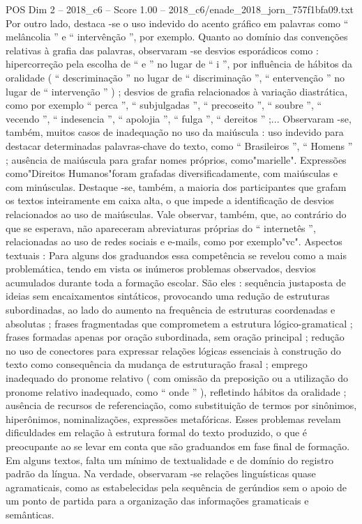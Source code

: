 \begin{textsample}{POS Dim 2 – 2018\_c6 – Score 1.00 – 2018\_c6/enade\_2018\_jorn\_757f1bfa09.txt}
Por outro lado, destaca -se o uso indevido do acento gráfico em palavras como “ melâncolia ” e “ intervênção ”, por exemplo.
Quanto ao domínio das convenções relativas à grafia das palavras, observaram -se desvios esporádicos como : hipercorreção pela escolha de “ e ” no lugar de “ i ”, por influência de hábitos da oralidade ( “ descriminação ” no lugar de “ discriminação ”, “ entervenção ” no lugar de “ intervenção ” ) ; desvios de grafia relacionados à variação diastrática, como por exemplo “ perca ”, “ subjulgadas ”, “ precoseito ”, “ soubre ”, “ vecendo ”, “ indesencia ”, “ apolojia ”, “ fulga ”, “ dereitos ” ;...
Observaram -se, também, muitos casos de inadequação no uso da maiúscula : uso indevido para destacar determinadas palavras-chave do texto, como “ Brasileiros ”, “ Homens ” ; ausência de maiúscula para grafar nomes próprios, como"marielle".
Expressões como"Direitos Humanos"foram grafadas diversificadamente, com maiúsculas e com minúsculas.
Destaque -se, também, a maioria dos participantes que grafam os textos inteiramente em caixa alta, o que impede a identificação de desvios relacionados ao uso de maiúsculas.
Vale observar, também, que, ao contrário do que se esperava, não apareceram abreviaturas próprias do “ internetês ”, relacionadas ao uso de redes sociais e e-mails, como por exemplo"vc".
Aspectos textuais : Para alguns dos graduandos essa competência se revelou como a mais problemática, tendo em vista os inúmeros problemas observados, desvios acumulados durante toda a formação escolar.
São eles : sequência justaposta de ideias sem encaixamentos sintáticos, provocando uma redução de estruturas subordinadas, ao lado do aumento na frequência de estruturas coordenadas e absolutas ; frases fragmentadas que comprometem a estrutura lógico-gramatical ; frases formadas apenas por oração subordinada, sem oração principal ; redução no uso de conectores para expressar relações lógicas essenciais à construção do texto como consequência da mudança de estruturação frasal ; emprego inadequado do pronome relativo ( com omissão da preposição ou a utilização do pronome relativo inadequado, como “ onde ” ), refletindo hábitos da oralidade ; ausência de recursos de referenciação, como substituição de termos por sinônimos, hiperônimos, nominalizações, expressões metafóricas.
Esses problemas revelam dificuldades em relação à estrutura formal do texto produzido, o que é preocupante ao se levar em conta que são graduandos em fase final de formação.
Em alguns textos, falta um mínimo de textualidade e de domínio do registro padrão da língua.
Na verdade, observaram -se relações linguísticas quase agramaticais, como as estabelecidas pela sequência de gerúndios sem o apoio de um ponto de partida para a organização das informações gramaticais e semânticas.

\end{textsample}
